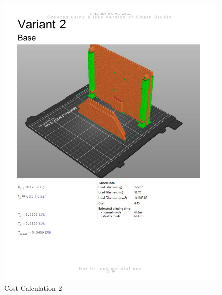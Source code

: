 \begin{figure}[H]
    \centering
    \includegraphics[width=\linewidth]{texs/appendix/data/costcalculation/cost1-02.jpg}
    \caption{Cost Calculation 2}
    \label{fig:cost-calculation-2}
\end{figure}

